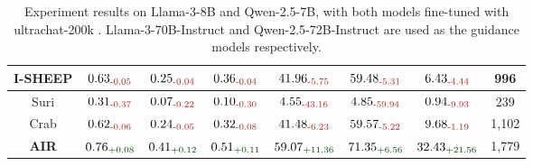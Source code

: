 \begin{table*}[!ht]
{\begin{tabular}{c|ccc|cc|cc}
I-SHEEP & $\text{0.63}_{\textcolor{deepred}{\text{-0.05}}}$ & $\text{0.25}_{\textcolor{deepred}{\text{-0.04}}}$ & $\text{0.36}_{\textcolor{deepred}{\text{-0.04}}}$ & $\text{41.96}_{\textcolor{deepred}{\text{-5.75}}}$ & $\text{59.48}_{\textcolor{deepred}{\text{-5.31}}}$ & $\text{6.43}_{\textcolor{deepred}{\text{-4.44}}}$ &  996  \\
\midrule
Suri & $\text{0.31}_{\textcolor{deepred}{\text{-0.37}}}$ & $\text{0.07}_{\textcolor{deepred}{\text{-0.22}}}$ & $\text{0.10}_{\textcolor{deepred}{\text{-0.30}}}$ & $\text{4.55}_{\textcolor{deepred}{\text{-43.16}}}$ & $\text{4.85}_{\textcolor{deepred}{\text{-59.94}}}$ & $\text{0.94}_{\textcolor{deepred}{\text{-9.93}}}$ &  239  \\
Crab & $\text{0.62}_{\textcolor{deepred}{\text{-0.06}}}$ & $\text{0.24}_{\textcolor{deepred}{\text{-0.05}}}$ & $\text{0.32}_{\textcolor{deepred}{\text{-0.08}}}$ & $\text{41.48}_{\textcolor{deepred}{\text{-6.23}}}$ & $\text{59.57}_{\textcolor{deepred}{\text{-5.22}}}$ & $\text{9.68}_{\textcolor{deepred}{\text{-1.19}}}$ &  1,102  \\
\midrule
\textbf{AIR} & \textbf{$\text{0.76}_{\textcolor{deepgreen}{\text{+0.08}}}$} & \textbf{$\text{0.41}_{\textcolor{deepgreen}{\text{+0.12}}}$} & \textbf{$\text{0.51}_{\textcolor{deepgreen}{\text{+0.11}}}$} & \textbf{$\text{59.07}_{\textcolor{deepgreen}{\text{+11.36}}}$} & \textbf{$\text{71.35}_{\textcolor{deepgreen}{\text{+6.56}}}$} & \textbf{$\text{32.43}_{\textcolor{deepgreen}{\text{+21.56}}}$} &  1,779  \\

\bottomrule
\end{tabular}}
\vspace{-3mm}
\caption{Experiment results on Llama-3-8B and Qwen-2.5-7B, with both models fine-tuned with ultrachat-200k \cite{ding2023enhancing}. Llama-3-70B-Instruct and Qwen-2.5-72B-Instruct are used as the guidance models respectively.}
\vspace{-3mm}
\label{table:main1}
\end{table*}




